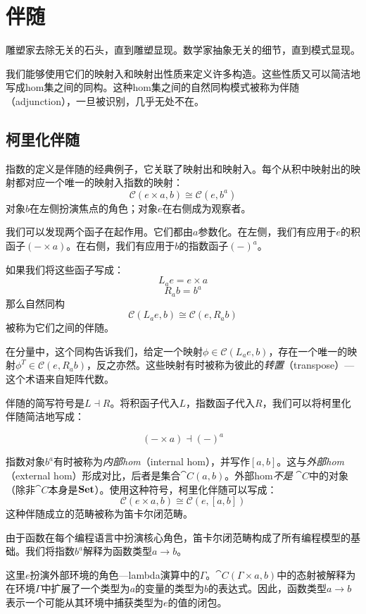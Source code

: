 \documentclass[DaoFP]{subfiles}
\begin{document}
\setcounter{chapter}{9}

\chapter{伴随}

雕塑家去除无关的石头，直到雕塑显现。数学家抽象无关的细节，直到模式显现。

我们能够使用它们的映射入和映射出性质来定义许多构造。这些性质又可以简洁地写成hom集之间的同构。这种hom集之间的自然同构模式被称为伴随（adjunction），一旦被识别，几乎无处不在。

\section{柯里化伴随}

指数的定义是伴随的经典例子，它关联了映射出和映射入。每个从积中映射出的映射都对应一个唯一的映射入指数的映射：
\[  \mathcal{C}(e \times a, b ) \cong  \mathcal{C} (e, b^a)  \]
对象$b$在左侧扮演焦点的角色；对象$e$在右侧成为观察者。

我们可以发现两个函子在起作用。它们都由$a$参数化。在左侧，我们有应用于$e$的积函子$(- \times a)$。在右侧，我们有应用于$b$的指数函子$(-)^a$。

如果我们将这些函子写成：
\[ L_a e = e \times a \]
\[ R_a b = b^a \]
那么自然同构
\[ \mathcal{C}(L_a e, b) \cong \mathcal{C}(e, R_a b) \]
被称为它们之间的伴随。

在分量中，这个同构告诉我们，给定一个映射$\phi \in \mathcal{C}(L_a e, b)$，存在一个唯一的映射$\phi^T \in \mathcal{C}(e, R_a b)$，反之亦然。这些映射有时被称为彼此的\emph{转置}（transpose）---这个术语来自矩阵代数。

伴随的简写符号是$L \dashv R$。将积函子代入$L$，指数函子代入$R$，我们可以将柯里化伴随简洁地写成：

\[ (- \times a) \dashv (-)^a \]

指数对象$b^a$有时被称为\emph{内部hom}（internal hom），并写作$[a, b]$。这与\emph{外部hom}（external hom）形成对比，后者是集合$\cat C (a, b)$。外部hom\emph{不是} $\cat C$中的对象（除非$\cat C$本身是$\mathbf{Set}$）。使用这种符号，柯里化伴随可以写成：
\[  \mathcal{C}(e \times a, b) \cong  \mathcal{C} (e, [a, b])  \]
这种伴随成立的范畴被称为笛卡尔闭范畴。

由于函数在每个编程语言中扮演核心角色，笛卡尔闭范畴构成了所有编程模型的基础。我们将指数$b^a$解释为函数类型$a \to b$。

这里$e$扮演外部环境的角色---lambda演算中的$\Gamma$。$\cat C(\Gamma \times a, b)$中的态射被解释为在环境$\Gamma$中扩展了一个类型为$a$的变量的类型为$b$的表达式。因此，函数类型$a \to b$表示一个可能从其环境中捕获类型为$e$的值的闭包。
\end{document}
